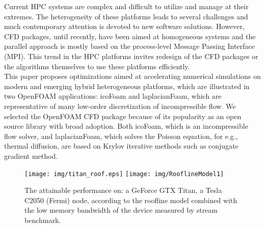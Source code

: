 \documentclass[3p,times]{elsarticle}
\begin{document}
Current HPC systems are complex and difficult to utilize and manage at their extremes. The heterogeneity of these platforms leads to several challenges and much contemporary attention is devoted to new software solutions. However, CFD packages, until recently, have been aimed at homogeneous systems and the parallel approach is mostly based on the process-level Message Passing Interface (MPI). This trend in the HPC platforms invites redesign of the CFD packages or the algorithms themselves to use these platforms efficiently.\\

This paper proposes optimizations aimed at accelerating numerical simulations on modern and emerging hybrid heterogeneous platforms, which are illustrated in two OpenFOAM \cite{openfoam} applications: icoFoam and laplacianFoam, which are representative of many low-order discretization of incompressible flow. We selected the OpenFOAM CFD package because of its popularity as an open source library with broad adoption. Both icoFoam, which is an incompressible flow solver, and laplacianFoam, which solves the Poisson equation, for e.g., thermal diffusion, are based on Krylov iterative methods such as conjugate gradient method. \\

\begin{figure}[h]
\begin{center}
\emph{}\texttt{[image: img/titan\_roof.eps]}
\emph{}\texttt{[image: img/RooflineModel1]}
\caption{The attainable performance on: \emph{} a GeForce GTX Titan, \emph{} a Tesla C2050 (Fermi)  node, according to the roofline model combined with the low memory bandwidth of the device measured by stream benchmark.}
\label{perf1}
\end{center}
\end{figure}
\end{document}

